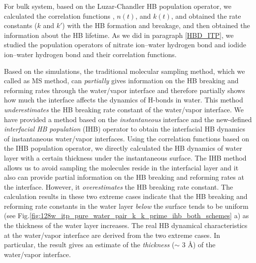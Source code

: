 For bulk system, based on the Luzar-Chandler HB population operator, 
we calculated the correlation functions \CHB, $n(t)$, and $k(t)$, and obtained the rate constants ($k$ and $k'$) with the HB formation and breakage, 
and then obtained the information about the HB lifetime. 
As we did in paragraph \ref{HBD_ITP}, we studied the population operators of nitrate ion--water hydrogen bond 
and iodide ion--water hydrogen bond and their correlation functions. 

Based on the simulations, the traditional molecular sampling method, which we called as MS method, %
can \emph{partially} gives information on the HB breaking and reforming
rates through the water/vapor interface and therefore partially shows how much the interface affects the dynamics of H-bonds in water. 
This method \emph{underestimates} the HB breaking rate constant of the water/vapor interface. 
We have provided a method based on the \emph{instantaneous} interface and the new-defined
\emph{interfacial HB population} (IHB) operator to obtain the interfacial HB dynamics of instantaneous water/vapor interfaces.  
Using the correlation functions based on the IHB population operator, we directly calculated the HB dynamics of water layer with a certain thickness 
under the instantaneous surface. 
The IHB method allows us to avoid sampling the molecules reside in the interfacial layer and
it also can provide partial information on the HB breaking and reforming rates at the interface. 
However, it \emph{overestimates} the HB breaking rate constant. The calculation results in these two extreme cases
indicate that the HB breaking and reforming rate constants in the water layer \emph{below} the surface tends to be uniform 
(see Fig.\thinspace\ref{fig:128w_itp_pure_water_pair_k_k_prime_ihb_both_schemes} a) 
as the thickness of the water layer increases. The real HB dynamical characteristics at the water/vapor interface 
are derived from the two extreme cases. 
In particular, the result gives an estimate of the \emph{thickness} ($\sim$ 3 \AA) of the water/vapor interface.  

